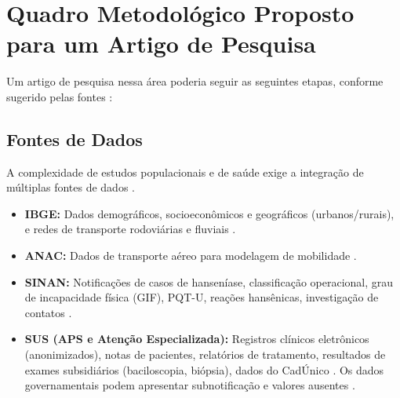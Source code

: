 \documentclass{article}
\begin{document}
\section{Quadro Metodológico Proposto para um Artigo de Pesquisa}
Um artigo de pesquisa nessa área poderia seguir as seguintes etapas, conforme sugerido pelas fontes \cite{inovacao_computacional_hanseniase, saldanha2021ciencia, cerqueirasilva2024risk}:

\subsection{Fontes de Dados}
A complexidade de estudos populacionais e de saúde exige a integração de múltiplas fontes de dados \cite{saldanha2021ciencia}.
\begin{itemize}
    \item \textbf{IBGE:} Dados demográficos, socioeconômicos e geográficos (urbanos/rurais), e redes de transporte rodoviárias e fluviais \cite{oliveira2024human, inovacao_computacional_hanseniase, saldanha2021ciencia}.
    \item \textbf{ANAC:} Dados de transporte aéreo para modelagem de mobilidade \cite{oliveira2024human, inovacao_computacional_hanseniase}.
    \item \textbf{SINAN:} Notificações de casos de hanseníase, classificação operacional, grau de incapacidade física (GIF), PQT-U, reações hansênicas, investigação de contatos \cite{brasil2017guia, brasil2022pcdt, cerqueirasilva2024risk}.
    \item \textbf{SUS (APS e Atenção Especializada):} Registros clínicos eletrônicos (anonimizados), notas de pacientes, relatórios de tratamento, resultados de exames subsidiários (baciloscopia, biópsia), dados do CadÚnico \cite{brasil2022pcdt, cerqueirasilva2024risk}. Os dados governamentais podem apresentar subnotificação e valores ausentes \cite{lima2022temporal}.
\end{itemize}
\end{document}
